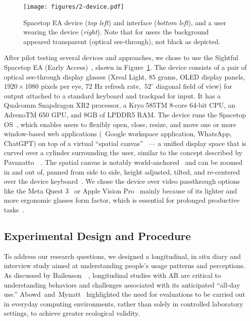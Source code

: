\begin{figure}[t]
    \centering
    \texttt{[image: figures/2-device.pdf]}
    \caption{Spacetop EA device (\textit{top left}) and interface (\textit{bottom left}), and a user wearing the device (\textit{right}). Note that for users the background appeared transparent (\ie optical see-through), not black as depicted.}
    \label{fig:device}
    \vspace{-1em}
\end{figure}

After pilot testing several devices and approaches, we chose to use the Sightful Spacetop EA (Early Access)~\cite{spacetopea}, shown in Figure~\ref{fig:device}.
The device consists of a pair of optical see-through display glasses (Xreal Light, $85$ grams, OLED display panels, $1920 \times 1080$ pixels per eye, $72$ Hz refresh rate, $~52^\circ$ diagonal field of view) for output attached to a standard keyboard and trackpad for input.
It has a Qualcomm Snapdragon XR2 processor, 
a Kryo 585TM 8-core 64-bit CPU, an AdrenoTM 650 GPU, and 8GB of LPDDR5 RAM.
The device runs the Spacetop OS~\cite{spacetopos}, which enables users to flexibly open, close, resize, and move one or more window-based web applications (\eg~Google workspace application, WhatsApp, ChatGPT) on top of a virtual ``spatial canvas''~\cite{spacetopspatialcanvas} --- a unified display space that is curved over a cylinder surrounding the user, similar to the concept described by Pavanatto~\etal~\cite{pavanatto2024multiplemonitors}.
The spatial canvas is notably world-anchored~\cite{feiner1993windows} and can be zoomed in and out of, panned from side to side, height adjusted, tilted, and re-centered over the device keyboard~\cite{spacetopadjustcanvas}. 
We chose the device over video passthrough options like the Meta Quest 3~\cite{metaquest3} or Apple Vision Pro~\cite{apple2023introducingvp} mainly because of its lighter and more ergonomic glasses form factor, which is essential for prolonged productive tasks~\cite{biener2022vrweek}.

\subsection{Experimental Design and Procedure}
To address our research questions, 
we designed a longitudinal, in situ diary and interview study aimed at understanding people's usage patterns and perceptions.
As discussed by Bailenson~\etal~\cite{bailenson2024seeing},
longitudinal studies with AR are critical to understanding behaviors and challenges associated with its anticipated ``all-day use.''
Abowd~and~Mynatt~\cite{abowd2000chartingubicomp} highlighted the need for evaluations to be carried out in everyday computing environments, rather than solely in controlled laboratory settings, to achieve greater ecological validity.


